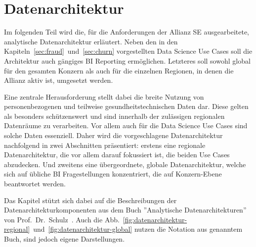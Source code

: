 \chapter{Datenarchitektur}
\label{chap:architektur}

Im folgenden Teil wird die, für die Anforderungen der Allianz SE ausgearbeitete,
analytische Datenarchitektur erläutert.
Neben den in den Kapiteln~\ref{sec:fraud}~und~\ref{sec:churn} 
vorgestellten Data Science Use Cases soll die Architektur
auch gängiges BI Reporting ermöglichen. 
Letzteres soll sowohl global für den gesamten Konzern 
als auch für die einzelnen Regionen, 
in denen die Allianz aktiv ist, umgesetzt werden.

Eine zentrale Herausforderung stellt dabei die breite Nutzung von
personenbezogenen und teilweise gesundheitstechnischen Daten dar.
Diese gelten als besonders schützenswert und sind innerhalb der zulässigen
regionalen Datenräume zu verarbeiten.
Vor allem auch für die Data Science Use Cases sind solche Daten essenziell.
Daher wird die vorgeschlagene Datenarchitektur nachfolgend
in zwei Abschnitten präsentiert: 
erstens eine regionale Datenarchitektur, die vor allem darauf fokussiert ist,
die beiden Use Cases abzudecken. 
Und zweitens eine übergeordnete, globale Datenarchitektur,
welche sich auf übliche BI Fragestellungen konzentriert, 
die auf Konzern-Ebene beantwortet werden.

Das Kapitel stützt sich dabei auf die 
Beschreibungen der Datenarchitekturkomponenten
aus dem Buch ''Analytische Datenarchitekturen''
von Prof.~Dr.~Schulz~\cite{schulz2024}.
Auch die Abb.~\ref{fig:datenarchitektur-regional}~und~\ref{fig:datenarchitektur-global}
nutzen die Notation aus genanntem Buch, sind jedoch eigene Darstellungen.



